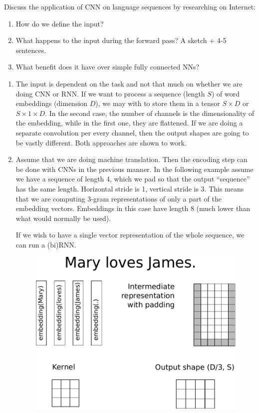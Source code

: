 \begin{exercise}

Discuss the application of CNN on language sequences by researching on Internet:
\begin{enumerate}
	\item How do we define the input?
	\item What happens to the input during the forward pass? A sketch + 4-5 sentences.
	\item What benefit does it have over simple fully connected NNs?
\end{enumerate}
\end{exercise}


\begin{solution}
\begin{enumerate}
   \item The input is dependent on the task and not that much on whether we are doing CNN or RNN. If we want to process a sequence (length $S$) of word embeddings (dimension $D$), we may with to store them in a tensor $S\times D$ or $S\times 1 \times D$. In the second case, the number of channels is the dimensionality of the embedding, while in the first one, they are flattened. If we are doing a separate convolution per every channel, then the output shapes are going to be vastly different. Both approaches are shown to work.
   \item Assume that we are doing machine translation. Then the encoding step can be done with CNNs in the previous manner. In the following example assume we have a sequence of length 4, which we pad so that the output ``sequence'' has the same length. Horizontal stride is 1, vertical stride is 3. This means that we are computing 3-gram representations of only a part of the embedding vectors. Embeddings in this case have length 8 (much lower than what would normally be used).
   
   If we wish to have a single vector representation of the whole sequence, we can run a (bi)RNN.
   
   \begin{figure}[ht]
        \centering
        \hspace{2.5cm}\includegraphics[width=0.6\linewidth]{img/cnn_sketch.pdf}
   \end{figure}
   

\end{enumerate}
\end{solution}
